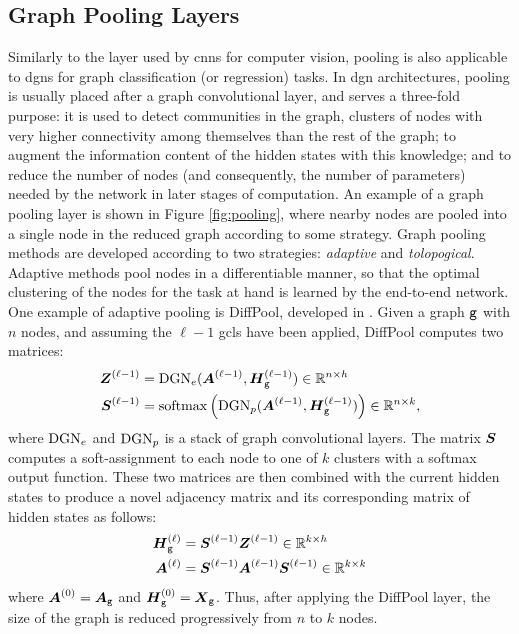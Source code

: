\subsection{Graph Pooling Layers}\label{sec:pooling}
Similarly to the layer used by \glspl{cnn} for computer vision, pooling is also applicable to \glspl{dgn} for graph classification (or regression) tasks. In \gls{dgn} architectures, pooling is usually placed after a graph convolutional layer, and serves a three-fold purpose: it is used to detect communities in the graph, \ie clusters of nodes with very higher connectivity among themselves than the rest of the graph; to augment the information content of the hidden states with this knowledge; and to reduce the number of nodes (and consequently, the number of parameters) needed by the network in later stages of computation. An example of a graph pooling layer is shown in Figure \ref{fig:pooling}, where nearby nodes are pooled into a single node in the reduced graph according to some strategy. Graph pooling methods are developed according to two strategies: \emph{adaptive} and \emph{tolopogical}. Adaptive methods pool nodes in a differentiable manner, so that the optimal clustering of the nodes for the task at hand is learned by the end-to-end network. One example of adaptive pooling is DiffPool, developed in \citep{ying2018diffpool}. Given a graph $\mathtt{g}$ with $n$ nodes, and assuming the $\ell-1$ \glspl{gcl} have been applied, DiffPool computes two matrices:
\begin{align*}
    \GenGraphLayerMat{z}{\ell-1} &= \Fun{DGN}_e(\LayerAdjMat{\ell-1},\LayerStateMat{g}{\ell-1}) \in \Real^{n \times h}\\
    \GenGraphLayerMat{s}{\ell-1} &= \softmax\Par{\Fun{DGN}_p(\LayerAdjMat{\ell-1},\LayerStateMat{g}{\ell-1})} \in \Real^{n \times k},
\end{align*}
where $\mathrm{DGN}_e$ and $\mathrm{DGN}_p$ is a stack of graph convolutional layers. The matrix $\Matrix{S}$ computes a soft-assignment to each node to one of $k$ clusters with a softmax output function. These two matrices are then combined with the current hidden states to produce a novel adjacency matrix and its corresponding matrix of hidden states as follows:
\begin{align*}
    \LayerStateMat{g}{\ell} &= \GenGraphLayerMat{s}{\ell-1}\GenGraphLayerMat{z}{\ell-1} \in \Real^{k \times h}\\
    \LayerAdjMat{\ell} &= \GenGraphLayerMat{s}{\ell-1}\LayerAdjMat{\ell-1}\GenGraphLayerMat{s}{\ell-1} \in \Real^{k \times k}
\end{align*}
where $\LayerAdjMat{0} = \AdjMatrix{g}$ and $\LayerStateMat{g}{0} = \FeatureMatrix{g}$. Thus, after applying the DiffPool layer, the size of the graph is reduced progressively from $n$ to $k$ nodes.

